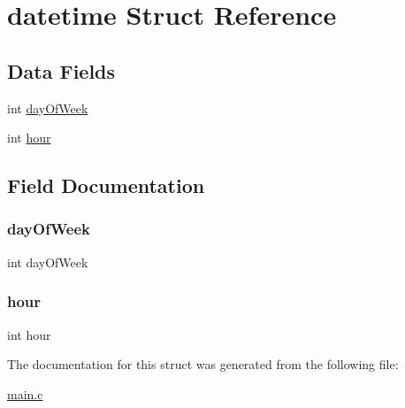 \hypertarget{structdatetime}{}\section{datetime Struct Reference}
\label{structdatetime}
\subsection*{Data Fields}
\begin{DoxyCompactItemize}
\item 
int \hyperlink{structdatetime_aaee8803c7ec30f625d6802f2a82ca05c}{day\+Of\+Week}
\item 
int \hyperlink{structdatetime_a15df9ba285cfd842f284025f904edc9c}{hour}
\end{DoxyCompactItemize}


\subsection{Field Documentation}
\hypertarget{structdatetime_aaee8803c7ec30f625d6802f2a82ca05c}{}\label{structdatetime_aaee8803c7ec30f625d6802f2a82ca05c} 
\subsubsection{\texorpdfstring{day\+Of\+Week}{dayOfWeek}}
{\footnotesize\ttfamily int day\+Of\+Week}

\hypertarget{structdatetime_a15df9ba285cfd842f284025f904edc9c}{}\label{structdatetime_a15df9ba285cfd842f284025f904edc9c} 
\subsubsection{\texorpdfstring{hour}{hour}}
{\footnotesize\ttfamily int hour}



The documentation for this struct was generated from the following file\+:\begin{DoxyCompactItemize}
\item 
\hyperlink{main_8c}{main.\+c}\end{DoxyCompactItemize}
